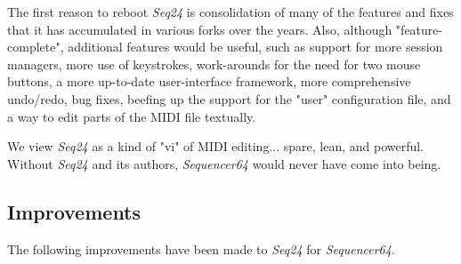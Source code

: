 \documentclass[
 11pt,
 twoside,
 a4paper,
 headinclude,
 footinclude,
 final                                 %
]{article}
\begin{document}
   The first reason to reboot \textsl{Seq24} is consolidation of many of the
   features and fixes that it has accumulated in various forks over the years.
   Also, although "feature-complete", additional features would be useful, such
   as support for more session managers, more use of keystrokes, work-arounds
   for the need for two mouse buttons, a more up-to-date user-interface
   framework, more comprehensive undo/redo, bug fixes, beefing up the
   support for the "user" configuration file, and a way to edit parts of the
   MIDI file textually.

   We view \textsl{Seq24} as a kind of "vi" of MIDI editing... spare, lean, and
   powerful.  Without \textsl{Seq24} and its authors, \textsl{Sequencer64}
   would never have come into being.

\subsection{Improvements}
\label{subsec:improvements}

   The following improvements have been made to \textsl{Seq24} for
   \textsl{Sequencer64}.
\end{document}
